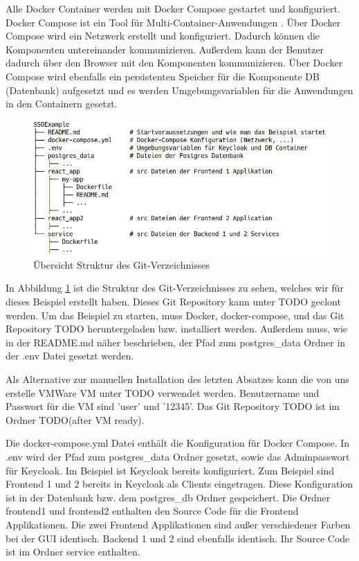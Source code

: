 Alle Docker Container werden mit Docker Compose gestartet und konfiguriert. Docker Compose ist ein Tool für Multi-Container-Anwendungen \cite{EB40}. Über Docker Compose wird ein Netzwerk erstellt und konfiguriert. Dadurch können die Komponenten untereinander kommunizieren. Außerdem kann der Benutzer dadurch über den Browser mit den Komponenten kommunizieren. Über Docker Compose wird ebenfalls ein persistenten Speicher für die Komponente DB (Datenbank) aufgesetzt und es werden Umgebungsvariablen für die Anwendungen in den Containern gesetzt.

\begin{figure}[!h]
	\centering
	\includegraphics[width=1\textwidth]{Images/Ebert/srcDirectoryStructure.PNG}
	\caption{Übersicht Struktur des Git-Verzeichnisses}
	\label{fig:EB_Struktur des Git-Verzeichnisses}
\end{figure}

In Abbildung \ref{fig:EB_Struktur des Git-Verzeichnisses} ist die Struktur des Git-Verzeichnisses zu sehen, welches wir für dieses Beispiel erstellt haben. Dieses Git Repository kann unter TODO geclont werden. Um das Beispiel zu starten, muss Docker, docker-compose, und das Git Repository TODO heruntergeladen bzw. installiert werden. Außerdem muss, wie in der README.md näher beschrieben, der Pfad zum postgres\_data Ordner in der .env Datei gesetzt werden.

Als Alternative zur manuellen Installation des letzten Absatzes kann die von uns erstelle VMWare VM unter TODO verwendet werden. Benutzername und Passwort für die VM sind 'user' und '12345'. Das Git Repository TODO ist im Ordner TODO(after VM ready).

Die docker-compose.yml Datei enthält die Konfiguration für Docker Compose. In .env wird der Pfad zum postgres\_data Ordner gesetzt, sowie das Adminpasswort für Keycloak. Im Beispiel ist Keycloak bereits konfiguriert. Zum Beispiel sind Frontend 1 und 2 bereits in Keycloak als Clients eingetragen. Diese Konfiguration ist in der Datenbank bzw. dem postgres\_db Ordner gespeichert. Die Ordner frontend1 und frontend2 enthalten den Source Code für die Frontend Applikationen. Die zwei Frontend Applikationen sind außer verschiedener Farben bei der GUI identisch. Backend 1 und 2 sind ebenfalls identisch. Ihr Source Code ist im Ordner service enthalten. 

